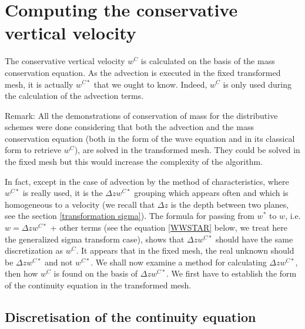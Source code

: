 \section{\label{calcul de w}Computing the conservative vertical velocity}

The conservative vertical velocity $w^C$ is calculated on the basis of the
mass conservation equation.
As the advection is executed in the fixed transformed mesh, it is actually
$w^{C\ast}$ that we ought to know. Indeed, $w^{C}$ is only used during the calculation
of the advection terms.

\begin{CommentBlock}{Remark:}
All the demonstrations of conservation of mass for the distributive
schemes were done considering that both the advection and the mass conservation equation
(both in the form of the wave equation and in its classical form to retrieve $w^C$),
are solved in the transformed mesh. They could be solved in the fixed mesh but
this would increase the complexity of the algorithm.
\end{CommentBlock}

In fact, except in the case of advection by the method of characteristics,
where $w^{C\ast}$ is really used, it is the $\Delta zw^{C\ast}$ grouping which
appears often and which is homogeneous to a velocity (we recall that $\Delta
z$ is the depth between two planes, see the section \ref{transformation sigma}).
The formula for passing from $w^{\ast}$ to $w$, i.e. $w=\Delta zw^{C\ast}$ +
other terms (see the equation \ref{WWSTAR} below, we treat here the generalized
sigma transform case), shows that $\Delta zw^{C\ast}$ should have the same
discretization as $w^C$. It appears that in the fixed mesh, the real unknown
should be $\Delta zw^{C\ast}$ and not $w^{C\ast}$. We shall now examine a method
for calculating $\Delta zw^{C\ast}$, then how $w^C$ is found on the basis of
$\Delta zw^{C\ast}$. We first have to establish the form of the continuity
equation in the transformed mesh.

\subsection{\label{continuitytransformed}Discretisation of the continuity equation}

